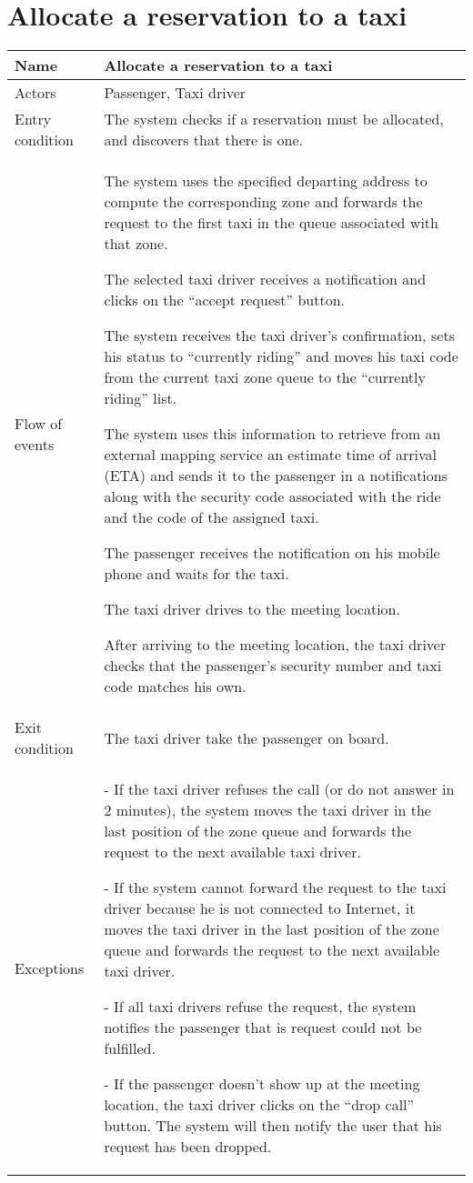 \section{Allocate a reservation to a taxi}
\begin{center}
\begin{longtable}{|l| p{9cm}|}
\hline
Name &
Allocate a reservation to a taxi \\
\hline
Actors &
Passenger, Taxi driver \\
\hline
Entry condition & 
The system checks if a reservation must be allocated, and discovers that there is one. \\
\hline
Flow of events & 
The system uses the specified departing address to compute the corresponding zone and forwards the request to the first taxi in the queue associated with that zone.

The selected taxi driver receives a notification
and clicks on the ``accept request'' button.

The system receives the taxi driver's confirmation, sets his status to ``currently riding'' and moves his taxi code from the current taxi zone queue to the ``currently riding'' list.

The system uses this information to retrieve from an external mapping service an estimate time of arrival (ETA) and sends it to the passenger in a notifications along with the security code associated with the ride and the code of the assigned taxi.

The passenger receives the notification on his mobile phone and waits for the taxi.

The taxi driver drives to the meeting location.

After arriving to the meeting location, the taxi driver checks that the passenger's security number and taxi code matches his own. \\
\hline
Exit condition &
The taxi driver take the passenger on board. \\
\hline
Exceptions &
- If the taxi driver refuses the call (or do not answer in 2 minutes), the system moves the taxi driver in the last position of the zone queue and forwards the request to the next available taxi driver.

- If the system cannot forward the request to the taxi driver because he is not connected to Internet, it moves the taxi driver in the last position of the zone queue and forwards the request to the next available taxi driver.

- If all taxi drivers refuse the request, the system notifies the passenger that is request could not be fulfilled.

- If the passenger doesn't show up at the meeting location, the taxi driver clicks on the ``drop call'' button. The system will then notify the user that his request has been dropped. \\
\hline
\end{longtable}
\end{center}


